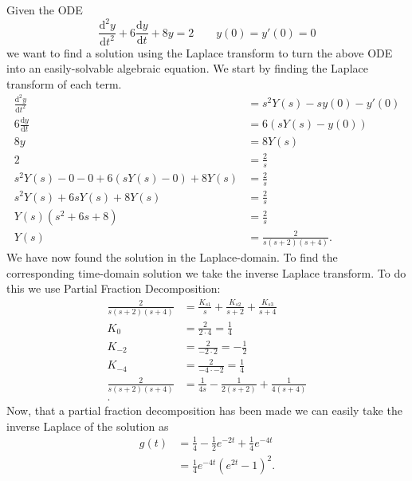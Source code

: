 \begin{exa}
  Given the ODE
  \begin{equation*}
    \frac{\mathrm{d}^2 y}{\mathrm{d}t^2} + 6 \frac{\mathrm{d}y}{\mathrm{d}t} + 8y = 2 \qquad y(0)=y'(0)=0
  \end{equation*}
  we want to find a solution using the Laplace transform to turn the above ODE into an easily-solvable algebraic equation.
  \tcblower
  We start by finding the Laplace transform of each term.
  \begin{align*}
    \frac{\mathrm{d}^2y}{\mathrm{d}t^2} &= s^2 Y(s) - sy(0) - y'(0) \\
    6 \frac{\mathrm{d}y}{\mathrm{d}t} &= 6 \left( sY(s) - y(0) \right) \\
    8y &= 8Y(s) \\
    2 &= \frac{2}{s} \\
    s^2 Y(s) - 0 - 0 + 6 \left( sY(s) - 0 \right) + 8Y(s) &= \frac{2}{s} \\
    s^2 Y(s) + 6sY(s) + 8Y(s) &= \frac{2}{s} \\
    Y(s) \left( s^2 + 6s + 8 \right) &= \frac{2}{s} \\
    Y(s) &= \frac{2}{s \left( s+2 \right) \left( s+4 \right)}
  .\end{align*}
  We have now found the solution in the Laplace-domain.
  To find the corresponding time-domain solution we take the inverse Laplace transform.
  To do this we use Partial Fraction Decomposition:
  \begin{align*}
    \frac{2}{s \left( s+2 \right) \left( s+4 \right)} &= \frac{K_{s 1}}{s} + \frac{K_{s 2}}{s + 2} + \frac{K_{s 3}}{s + 4}\\
    K_{0} &= \frac{2}{2 \cdot 4} = \frac{1}{4} \\
    K_{-2} &= \frac{2}{-2 \cdot 2} = - \frac{1}{2} \\
    K_{-4} &= \frac{2}{-4 \cdot -2} = \frac{1}{4} \\
    \frac{2}{s (s+2)(s+4)} &= \frac{1}{4 s} - \frac{1}{2(s + 2)} + \frac{1}{4(s + 4)}\\
  .\end{align*}
  Now, that a partial fraction decomposition has been made we can easily take the inverse Laplace of the solution as
  \begin{align*}
    g(t) &= \frac{1}{4} - \frac{1}{2} e^{-2t} + \frac{1}{4} e^{-4t} \\
     &= \frac{1}{4} e^{-4 t} \left(e^{2 t}-1\right)^2
  .\end{align*}
\end{exa}


